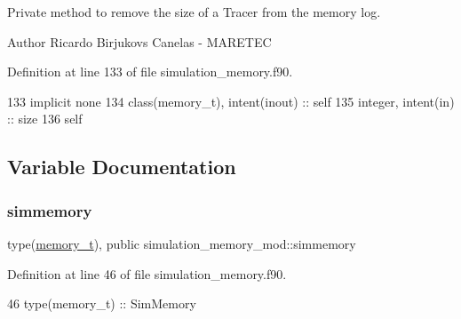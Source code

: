 Private method to remove the size of a Tracer from the memory log. 

\begin{DoxyAuthor}{Author}
Ricardo Birjukovs Canelas -\/ M\+A\+R\+E\+T\+EC 
\end{DoxyAuthor}


Definition at line 133 of file simulation\+\_\+memory.\+f90.


\begin{DoxyCode}
133     \textcolor{keywordtype}{implicit none}
134     \textcolor{keywordtype}{class}(memory\_t), \textcolor{keywordtype}{intent(inout)} :: self
135     \textcolor{keywordtype}{integer}, \textcolor{keywordtype}{intent(in)} :: size
136     self%
\end{DoxyCode}


\subsection{Variable Documentation}
\mbox{\label{namespacesimulation__memory__mod_af3e2714796469b4b1ec247569b184088}} 
\subsubsection{\texorpdfstring{simmemory}{simmemory}}
{\footnotesize\ttfamily type(\mbox{\hyperlink{structsimulation__memory__mod_1_1memory__t}{memory\+\_\+t}}), public simulation\+\_\+memory\+\_\+mod\+::simmemory}



Definition at line 46 of file simulation\+\_\+memory.\+f90.


\begin{DoxyCode}
46     \textcolor{keywordtype}{type}(memory\_t) :: SimMemory
\end{DoxyCode}
